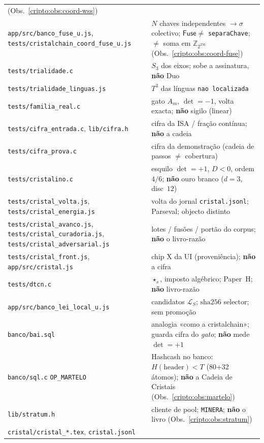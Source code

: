 \documentclass[11pt,a4paper]{article}
\newcommand{\code}[1]{\texttt{\small #1}}
\begin{document}
\begin{center}
\begin{tabular}{@{}p{}p{}@{}}
    (Obs.~\ref{cripto:obs:coord-wss}) \\
\code{app/src/banco\_fuse\_u.js},
\code{tests/cristalchain\_coord\_fuse\_u.js}
  & $N$ chaves independentes $\to\sigma$ colectivo;
    $\mathsf{Fuse}\neq$ \code{separaChave}; $\neq$ soma em $\mathbb{Z}_{2^{256}}$
    (Obs.~\ref{cripto:obs:coord-fuse}) \\
\code{tests/trialidade.c}
  & $S_3$ dos eixos; sobe a assinatura, \textbf{não} Duo \\
\code{tests/trialidade\_linguas.js}
  & $T^3$ das línguas \texttt{nao localizada} \\
\code{tests/familia\_real.c}
  & gato $A_m$, $\det=-1$, volta exacta; \textbf{não} sigilo (linear) \\
\code{tests/cifra\_entrada.c}, \code{lib/cifra.h}
  & cifra da ISA / fração contínua; \textbf{não} a cadeia \\
\code{tests/cifra\_prova.c}
  & cifra da demonstração (cadeia de passos $\neq$ cobertura) \\
\code{tests/cristalino.c}
  & esquilo $\det=+1$, $D<0$, ordem $4/6$;
    \textbf{não} ouro branco ($d=3$, disc~$12$) \\
\code{tests/cristal\_volta.js},
\code{tests/cristal\_energia.js}
  & volta do jornal \code{cristal.jsonl}; Parseval; objecto distinto \\
\code{tests/cristal\_avanco.js},
\code{tests/cristal\_curadoria.js},
\code{tests/cristal\_adversarial.js}
  & lotes / fusões / portão do corpus; \textbf{não} o livro-razão \\
\code{tests/cristal\_front.js}, \code{app/src/cristal.js}
  & chip X da UI (proveniência); \textbf{não} a cifra \\
\code{tests/dtcn.c}
  & $\star_s$, imposto algébrico; Paper~H; \textbf{não} livro-razão \\
\code{app/src/banco\_lei\_local\_u.js}
  & candidatos $\mathcal{L}_S$; $\mathrm{sha256}$ selector; sem promoção \\
\code{banco/bai.sql}
  & analogia «como a cristalchain»; guarda cifra do \emph{gato};
    \textbf{não} mede $\det=+1$ \\
\code{banco/sql.c} \code{OP\_MARTELO}
  & Hashcash no banco: $H(\mathrm{header})<T$ (80+32 átomos);
    \textbf{não} a Cadeia de Cristais (Obs.~\ref{cripto:obs:martelo}) \\
\code{lib/stratum.h}
  & cliente de pool; \code{MINERA}; \textbf{não} o livro
    (Obs.~\ref{cripto:obs:stratum}) \\
\code{cristal/cristal\_*.tex}, \code{cristal.jsonl}

\end{tabular}
\end{center}
\end{document}
